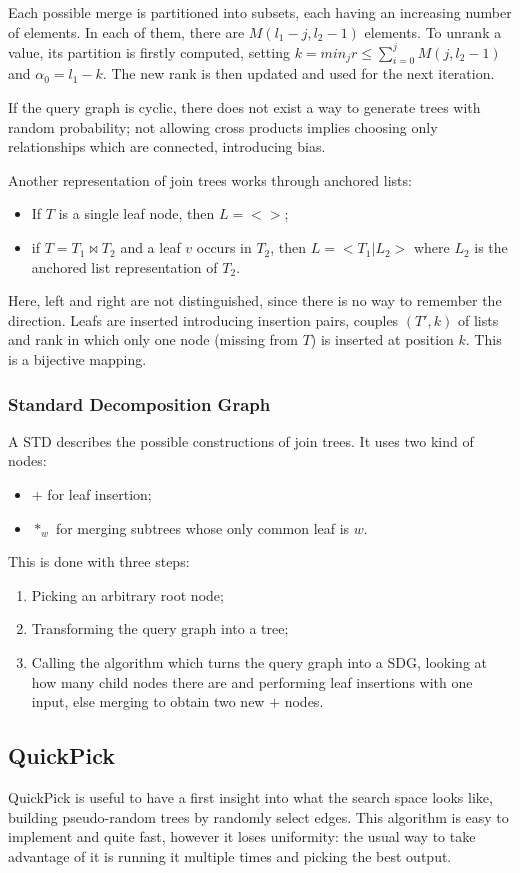 Each possible merge is partitioned into subsets, each having an increasing number of elements. In each of them, there are $M(l_1 - j, l_2 - 1)$ elements. To unrank a value, its partition is firstly computed, setting $k = min_j r \leq \sum_{i=0}^{j} M(j, l_2 - 1)$ and $\alpha_0 = l_1 - k$. The new rank is then updated and used for the next iteration.

If the query graph is cyclic, there does not exist a way to generate trees with random probability; not allowing cross products implies choosing only relationships which are connected, introducing bias. 

Another representation of join trees works through anchored lists:
\begin{itemize}
	\item If $T$ is a single leaf node, then $L = <>$;
	\item if $T = T_1 \bowtie T_2$ and a leaf $v$ occurs in $T_2$, then $L = <T_1 | L_2>$ where $L_2$ is the anchored list representation of $T_2$.
\end{itemize}
Here, left and right are not distinguished, since there is no way to remember the direction. Leafs are inserted introducing insertion pairs, couples $(T', k)$ of lists and rank in which only one node (missing from $T$) is inserted at position $k$. This is a bijective mapping.

\subsubsection{Standard Decomposition Graph}
A STD describes the possible constructions of join trees. It uses two kind of nodes:
\begin{itemize}
	\item $+$ for leaf insertion;
	\item $*_w$ for merging subtrees whose only common leaf is $w$.
\end{itemize}
This is done with three steps:
\begin{enumerate}
	\item Picking an arbitrary root node;
	\item Transforming the query graph into a tree;
	\item Calling the algorithm which turns the query graph into a SDG, looking at how many child nodes there are and performing leaf insertions with one input, else merging to obtain two new $+$ nodes.
\end{enumerate}

\subsection{QuickPick}
QuickPick is useful to have a first insight into what the search space looks like, building pseudo-random trees by randomly select edges. This algorithm is easy to implement and quite fast, however it loses uniformity: the usual way to take advantage of it is running it multiple times and picking the best output.

